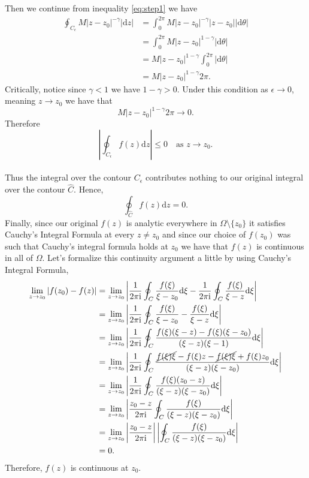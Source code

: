 \documentclass[10pt]{amsart}
\newcommand{\D}{\mathrm{d}}
\newcommand{\I}{\mathrm{i}}
\theoremstyle{nonumberplain}
\begin{document}
\begin{enumerate}[label={\bf {\arabic*}:}]
Then we continue from inequality \eqref{eq:step1} we have
\begin{align*}
\oint_{C_\epsilon} M |z - z_0|^{-\gamma} \left|\D z \right| &= \int_0^{2 \pi} M |z - z_0|^{-\gamma} |z - z_0||\D \theta| \\
	&= \int_0^{2 \pi} M |z - z_0|^{1-\gamma} |\D \theta| \\
	&= M |z - z_0|^{1-\gamma} \int_0^{2 \pi} |\D \theta| \\
	&= M |z - z_0|^{1-\gamma} 2 \pi.
\end{align*}
Critically, notice since $\gamma < 1$ we have $1 - \gamma > 0$.
Under this condition as $\epsilon \rightarrow 0$, meaning $z\rightarrow z_0$ we have that
$$M |z - z_0|^{1-\gamma} 2 \pi \rightarrow 0.$$
Therefore 
$$\left|\oint_{C_\epsilon} f(z)\D z \right| \leq 0 \quad \text{as $z\rightarrow z_0$}.$$
\\
Thus the integral over the contour $C_\epsilon$ contributes nothing to our original integral over the contour $\widehat C$.
Hence,
$$\oint_{\widehat C} f(z)\D z = 0.$$
Finally, since our original $f(z)$ is analytic everywhere in $\Omega \setminus \{z_0\}$ it satisfies Cauchy's Integral Formula at every $z \neq z_0$ and since our choice of $f(z_0)$ was such that Cauchy's integral formula holds at $z_0$ we have that $f(z)$ is continuous in all of $\Omega$.
Let's formalize this continuity argument a little by using Cauchy's Integral Formula,
\begin{align*}
\lim_{z \rightarrow z_0} \left| f(z_0) - f(z) \right|
	&= \lim_{z \rightarrow z_0} \left| \frac 1 {2\pi \I} \oint_C \frac {f(\xi)}{\xi - z_0} \D \xi - \frac 1 {2\pi \I}\oint_C \frac {f(\xi)}{\xi - z} \D \xi \right| \\
	&= \lim_{z \rightarrow z_0} \left| \frac 1 {2\pi \I} \oint_C \frac {f(\xi)}{\xi - z_0} -  \frac {f(\xi)}{\xi - z} \D \xi \right| \\
	&= \lim_{z \rightarrow z_0} \left| \frac 1 {2\pi \I} \oint_C \frac {f(\xi)(\xi - z) - f(\xi)(\xi - z_0)}{(\xi - z)(\xi - 1)} \D \xi \right| \\
	&= \lim_{z \rightarrow z_0} \left| \frac 1 {2\pi \I} \oint_C \frac {\cancel{f(\xi)\xi} - f(\xi)z - \cancel{f(\xi)\xi} + f(\xi)z_0}{(\xi - z)(\xi - z_0)} \D \xi \right| \\
	&= \lim_{z \rightarrow z_0} \left| \frac 1 {2\pi \I} \oint_C \frac {f(\xi)(z_0 - z)}{(\xi - z)(\xi - z_0)} \D \xi \right| \\
	&= \lim_{z \rightarrow z_0} \left| \frac {z_0 - z} {2\pi \I} \oint_C \frac {f(\xi)}{(\xi - z)(\xi - z_0)} \D \xi \right| \\
	&= \lim_{z \rightarrow z_0} \left| \frac {z_0 - z} {2\pi \I} \right| \left|\oint_C \frac {f(\xi)}{(\xi - z)(\xi - z_0)} \D \xi \right| \\
	&= 0.
\end{align*}
Therefore, $f(z)$ is continuous at $z_0$. \\


\end{enumerate}
\end{document}
